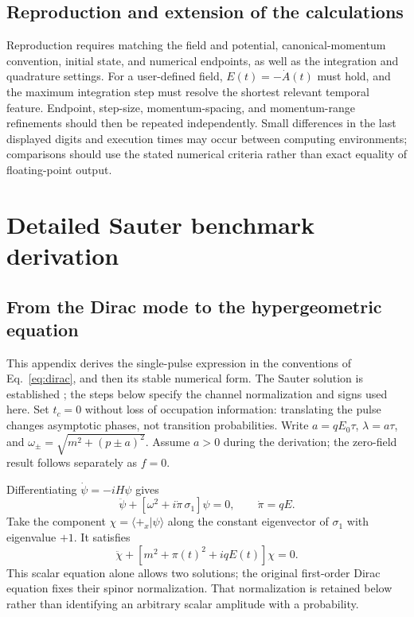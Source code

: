\documentclass[11pt,a4paper]{article}
\begin{document}
\subsection{Reproduction and extension of the calculations}
Reproduction requires matching the field and potential, canonical-momentum convention, initial state, and numerical endpoints, as well as the integration and quadrature settings. For a user-defined field, $E(t)=-\dot A(t)$ must hold, and the maximum integration step must resolve the shortest relevant temporal feature. Endpoint, step-size, momentum-spacing, and momentum-range refinements should then be repeated independently. Small differences in the last displayed digits and execution times may occur between computing environments; comparisons should use the stated numerical criteria rather than exact equality of floating-point output.

\section{Detailed Sauter benchmark derivation}
\label{app:sauterderivation}
\subsection{From the Dirac mode to the hypergeometric equation}
This appendix derives the single-pulse expression in the conventions of Eq.~\eqref{eq:dirac}, and then its stable numerical form. The Sauter solution is established \cite[Sec.~II.C.2, Eqs.~(77)--(99)]{Hebenstreit2010}; the steps below specify the channel normalization and signs used here. Set $t_c=0$ without loss of occupation information: translating the pulse changes asymptotic phases, not transition probabilities. Write $a=qE_0\tau$, $\lambda=a\tau$, and $\omega_\pm=\sqrt{m^2+(p\pm a)^2}$. Assume $a>0$ during the derivation; the zero-field result follows separately as $f=0$.

Differentiating $\dot\psi=-iH\psi$ gives
\begin{equation}
 \ddot\psi+[\omega^2+i\dot\pi\,\sigma_1]\psi=0,
 \qquad \dot\pi=qE.
\end{equation}
Take the component $\chi=\langle+_x|\psi\rangle$ along the constant eigenvector of $\sigma_1$ with eigenvalue $+1$. It satisfies
\begin{equation}
 \ddot\chi+[m^2+\pi(t)^2+iqE(t)]\chi=0.
 \label{eq:sauterscalar}
\end{equation}
This scalar equation alone allows two solutions; the original first-order Dirac equation fixes their spinor normalization. That normalization is retained below rather than identifying an arbitrary scalar amplitude with a probability.
\end{document}
